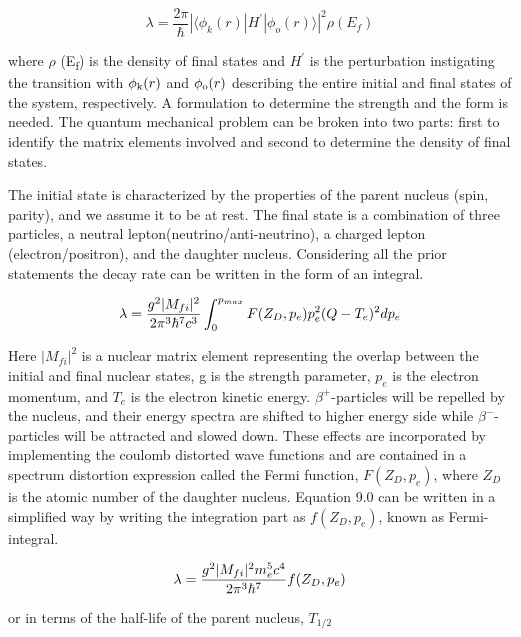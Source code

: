 \documentclass[a4paper,12pt,twoside]{report}
\begin{document}
\begin{equation}
  \lambda = \frac{2\pi}{\hbar}|\langle\phi_{k}(r)|H^{'}|\phi_{o}(r)\rangle|^2\rho(E_{f})
\end{equation}

    where $\rho$ (E\textsubscript{f}) is the density of final states and $H^{'}$ is the perturbation instigating the transition with $\phi\textsubscript{k}(r)$ and $\phi\textsubscript{o}(r)$ describing the entire initial and final states of the system, respectively. A formulation to determine the strength and the form is needed. The quantum mechanical problem can be broken into two parts: first to identify the matrix elements involved and second to determine the density of final states.
    
The initial state is characterized by the properties of the parent nucleus (spin, parity), and we assume it to be at rest. The final state is a combination of three particles, a neutral lepton(neutrino/anti-neutrino), a charged lepton (electron/positron), and the daughter nucleus. Considering all the prior statements the decay rate can be written in the form of an integral.

\begin{equation}
    \lambda = \frac{g^2 |M_{fi}|\textsuperscript{2}}{2\pi^3\hbar^7c^3}\int_{0}^{p_{max}} F(Z_{D},p_{e})p_{e}^2(Q-T_{e})^2dp_{e}
\end{equation}

Here $|M_{fi}|^2$ is a nuclear matrix element representing the overlap between the initial and final	
nuclear states, g is the strength parameter, $p_{e}$ is the electron momentum, and $T_{e}$ is the electron kinetic energy. $\beta^{+}$-particles will be repelled by the nucleus, and their energy spectra are shifted to higher energy side while $\beta^{-}$-particles will be attracted and slowed down. These effects are incorporated by implementing the coulomb distorted wave functions and are contained in a spectrum distortion expression called the Fermi function, $F(Z_{D},p_{e})$, where $Z_{D}$ is the atomic number of the daughter nucleus. Equation 9.0 can be written in a simplified way by writing the integration part as $f(Z_{D},p_{e})$, known as Fermi-integral. 

\begin{equation}
    \lambda = \frac{g^2 |M_{fi}|\textsuperscript{2} m_{e}^5c^4}{2\pi^3\hbar^7}f(Z_{D},p_{e}) 
\end{equation}

or in terms of the half-life of the parent nucleus, $T_{1/2}$ 
\end{document}

